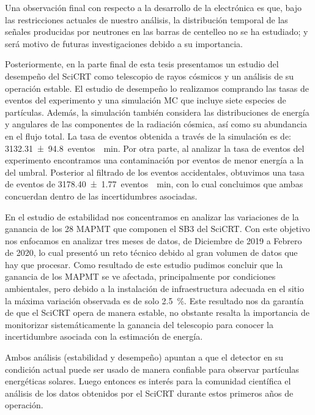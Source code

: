 Una observación final con respecto a la desarrollo de la electrónica es que, bajo las restricciones actuales de nuestro análisis, la distribución temporal de las señales producidas por neutrones en las barras de centelleo no se ha estudiado; y será motivo de futuras investigaciones debido a su importancia.

Posteriormente, en la parte final de esta tesis presentamos un estudio del desempeño del SciCRT como telescopio de rayos cósmicos y un análisis de su operación estable. El estudio de desempeño lo realizamos comprando las tasas de eventos del experimento y una simulación MC que incluye siete especies de partículas. Además, la simulación también considera las distribuciones de energía y angulares de las componentes de la radiación cósmica, así como su abundancia en el flujo total. La tasa de eventos obtenida a través de la simulación es de: \SI{3132.31(9480)}{eventos \per\minute}. Por otra parte, al analizar la tasa de eventos del  experimento encontramos una contaminación por eventos de menor energía a la del umbral. Posterior al filtrado de los eventos accidentales, obtuvimos una tasa de eventos de \SI{3178.40(177)}{eventos \per\minute}, con lo cual concluimos que ambas concuerdan dentro de las incertidumbres asociadas.

En el estudio de estabilidad nos concentramos en analizar las variaciones de la ganancia de los \num{28} MAPMT que componen el SB3 del SciCRT. Con este objetivo nos enfocamos en analizar tres meses de datos, de Diciembre de \num{2019} a Febrero de \num{2020}, lo cual presentó un reto técnico debido al gran volumen de datos que hay que procesar. Como resultado de este estudio pudimos concluir que la ganancia de los MAPMT se ve afectada, principalmente por condiciones ambientales, pero debido a la instalación de infraestructura adecuada en el sitio la máxima variación observada es de solo \SI{2.5}{\percent}. Este resultado nos da garantía de que el SciCRT opera de manera estable, no obstante resalta la importancia de monitorizar sistemáticamente la ganancia del telescopio para conocer la incertidumbre asociada con la estimación de energía.

Ambos análisis (estabilidad y desempeño) apuntan a que el detector en su condición actual puede ser usado de manera confiable para observar partículas energéticas solares. Luego entonces es interés para la comunidad científica el análisis de los datos obtenidos por el SciCRT durante estos primeros años de operación.

